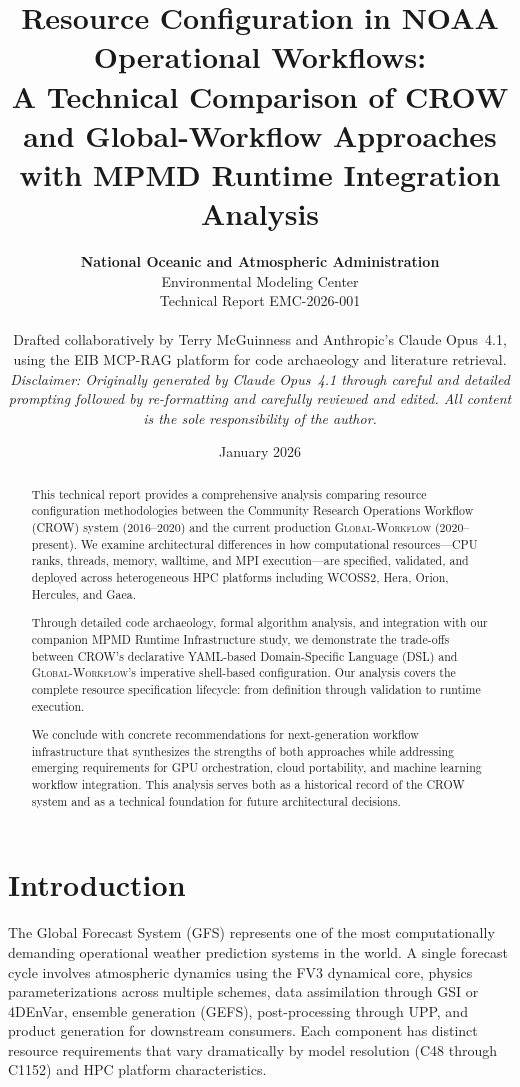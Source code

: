 \documentclass[11pt,twoside]{article}
\title{Resource Configuration in NOAA Operational Workflows:\\
\Large A Technical Comparison of CROW and Global-Workflow Approaches\\[1em]
\large with MPMD Runtime Integration Analysis}
\author{
  \textbf{National Oceanic and Atmospheric Administration}\\
  Environmental Modeling Center\\[0.5em]
  \small Technical Report EMC-2026-001\\[0.5em]
  \parbox{0.85\textwidth}{%
    \footnotesize Drafted collaboratively by Terry McGuinness and Anthropic's Claude Opus~4.1, using the EIB MCP-RAG platform for code archaeology and literature retrieval.\\[0.4em]
    \footnotesize \textit{Disclaimer: Originally generated by Claude Opus~4.1 through careful and detailed prompting followed by re-formatting and carefully reviewed and edited. All content is the sole responsibility of the author.}%
  }
}
\date{January 2026}
\newcommand{\crow}{\textsc{CROW}}
\newcommand{\gw}{\textsc{Global-Workflow}}
\newcommand{\mpmd}{\textsc{MPMD}}
\begin{document}
\raggedbottom

\setlength{\floatsep}{8pt plus 2pt minus 2pt}
\setlength{\textfloatsep}{10pt plus 2pt minus 2pt}
\setlength{\intextsep}{8pt plus 2pt minus 2pt}

\maketitle

\begin{abstract}
\noindent This technical report provides a comprehensive analysis comparing resource configuration methodologies between the Community Research Operations Workflow (\crow{}) system (2016--2020) and the current production \gw{} (2020--present). We examine architectural differences in how computational resources---CPU ranks, threads, memory, walltime, and MPI execution---are specified, validated, and deployed across heterogeneous HPC platforms including WCOSS2, Hera, Orion, Hercules, and Gaea.

Through detailed code archaeology, formal algorithm analysis, and integration with our companion \mpmd{} Runtime Infrastructure study, we demonstrate the trade-offs between \crow{}'s declarative YAML-based Domain-Specific Language (DSL) and \gw{}'s imperative shell-based configuration. Our analysis covers the complete resource specification lifecycle: from definition through validation to runtime execution.

We conclude with concrete recommendations for next-generation workflow infrastructure that synthesizes the strengths of both approaches while addressing emerging requirements for GPU orchestration, cloud portability, and machine learning workflow integration. This analysis serves both as a historical record of the \crow{} system and as a technical foundation for future architectural decisions.
\end{abstract}

\newpage
\tableofcontents
\newpage

\section{Introduction}
\label{sec:introduction}

The Global Forecast System (GFS) represents one of the most computationally demanding operational weather prediction systems in the world. A single forecast cycle involves atmospheric dynamics using the FV3 dynamical core, physics parameterizations across multiple schemes, data assimilation through GSI or 4DEnVar, ensemble generation (GEFS), post-processing through UPP, and product generation for downstream consumers. Each component has distinct resource requirements that vary dramatically by model resolution (C48 through C1152) and HPC platform characteristics.
\end{document}
